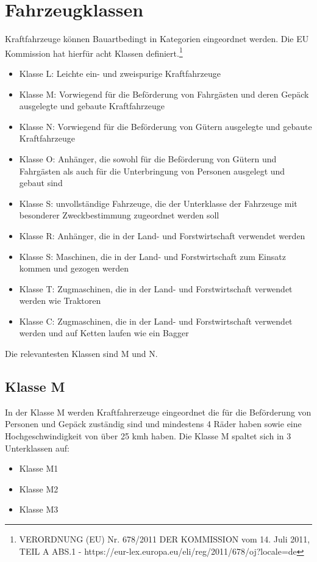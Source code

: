 \section{Fahrzeugklassen}

Kraftfahrzeuge können Bauartbedingt in Kategorien eingeordnet werden.
Die EU Kommission hat hierfür acht Klassen definiert.\footnote{VERORDNUNG (EU) Nr. 678/2011 DER KOMMISSION
	vom 14. Juli 2011, TEIL A ABS.1 - https://eur-lex.europa.eu/eli/reg/2011/678/oj?locale=de}

\begin{itemize}
	\item Klasse L: Leichte ein- und zweispurige Kraftfahrzeuge
	\item Klasse M: Vorwiegend für die Beförderung von Fahrgästen und deren Gepäck ausgelegte und gebaute Kraftfahrzeuge
	\item Klasse N: Vorwiegend für die Beförderung von Gütern ausgelegte und gebaute Kraftfahrzeuge
	\item Klasse O: Anhänger, die sowohl für die Beförderung von Gütern und Fahrgästen als auch für die Unterbringung von Personen ausgelegt und gebaut sind
	\item Klasse S: unvollständige Fahrzeuge, die der Unterklasse der Fahrzeuge mit besonderer Zweckbestimmung zugeordnet werden soll
	\item Klasse R: Anhänger, die in der Land- und Forstwirtschaft verwendet werden
	\item Klasse S: Maschinen, die in der Land- und Forstwirtschaft zum Einsatz kommen und gezogen werden
	\item Klasse T: Zugmaschinen, die in der Land- und Forstwirtschaft verwendet werden wie Traktoren
	\item Klasse C: Zugmaschinen, die in der Land- und Forstwirtschaft verwendet werden und auf Ketten laufen wie ein Bagger
\end{itemize}

Die relevantesten Klassen sind M und N.
\vspace{0.5cm}

\subsection{Klasse M}
In der Klasse M werden Kraftfahrerzeuge eingeordnet die für die Beförderung von Personen und Gepäck zuständig sind und mindestens 4 Räder haben sowie eine Hochgeschwindigkeit von über 25 \ac{kmh} haben.
\newline
Die Klasse M spaltet sich in 3 Unterklassen auf:
\begin{itemize}
	\item {Klasse M1}
	\item {Klasse M2}
	\item {Klasse M3}
\end{itemize}
